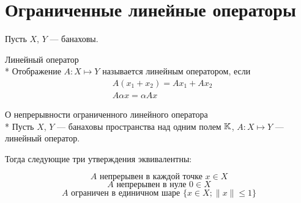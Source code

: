 \section{Ограниченные линейные операторы}

Пусть $X$, $Y$ --- банаховы.

\begin{dfn}{Линейный оператор}\\*
  Отображение $A : X \mapsto Y$ называется линейным оператором, если
  \begin{align*}
    & A (x_1 + x_2) = A x_1 + A x_2 \\
    & A \alpha x = \alpha A x
  \end{align*}
\end{dfn}

\begin{thm}{О непрерывности ограниченного линейного оператора}\label{th:l-b-def-equiv}\\*
Пусть $X$, $Y$ --- банаховы пространства над одним полем $\mathbb{K}$,
$A : X \mapsto Y$ --- линейный оператор.

Тогда следующие три утверждения эквивалентны:

\begin{equation} \label{eq:lb-1}
  A \text{ непрерывен в каждой точке } x\in X \end{equation}
\begin{equation} \label{eq:lb-2}
  A \text{ непрерывен в нуле } 0\in X \end{equation}
\begin{equation} \label{eq:lb-3}
  A \text{ ограничен в единичном шаре } \{x\in X ; \|x\|\leq 1\} \end{equation}
\end{thm}
